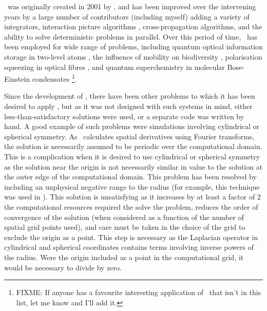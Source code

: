 \XMDS\ was originally created in 2001 by \citet{Collecutt:2001}, and has been improved over the intervening years by a large number of contributors (including myself) adding a variety of integrators, interaction picture algorithms \citep{Caradoc-Davies:2000qy}, cross-propagation algorithms, and the ability to solve deterministic problems in parallel.  Over this period of time, \XMDS\ has been employed for wide range of problems, including quantum optical information storage in two-level atoms \citep{Hetet:2008}, the influence of mobility on biodiversity \citep{Reichenbach:2007}, polarisation squeezing in optical fibres \citep{Corney:2006}, and quantum superchemistry in molecular Bose-Einstein condensates \citep{Hope:2001a}\footnote{FIXME: If anyone has a favourite interesting application of \XMDS\ that isn't in this list, let me know and I'll add it.}.  

Since the development of \XMDS, there have been other problems to which it has been desired to apply \XMDS, but as it was not designed with such systems in mind, either less-than-satisfactory solutions were used, or a separate code was written by hand.  A good example of such problems were simulations involving cylindrical or spherical symmetry.  As \XMDS\ calculates spatial derivatives using Fourier transforms, the solution is necessarily assumed to be periodic over the computational domain.  This is a complication when it is desired to use cylindrical or spherical symmetry as the solution near the origin is not necessarily similar in value to the solution at the outer edge of the computational domain.  This problem has been resolved by including an unphysical negative range to the radius (for example, this technique was used in \citep{Wuster:2005,Dall:2009}).  This solution is unsatisfying as it increases by at least a factor of 2 the computational resources required the solve the problem, reduces the order of convergence of the solution (when considered as a function of the number of spatial grid points used), and care must be taken in the choice of the grid to exclude the origin as a point.  This step is necessary as the Laplacian operator in cylindrical and spherical coordinates contains terms involving inverse powers of the radius.  Were the origin included as a point in the computational grid, it would be necessary to divide by zero.

